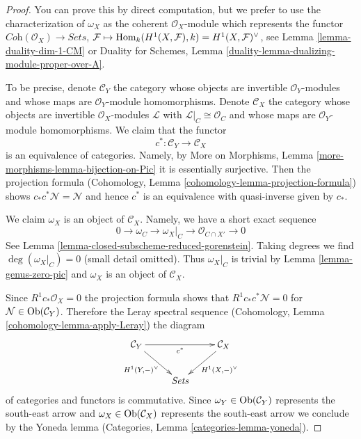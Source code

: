 \begin{proof}
You can prove this by direct computation, but we prefer to use the
characterization of $\omega_X$ as the coherent $\mathcal{O}_X$-module
which represents the functor
$\textit{Coh}(\mathcal{O}_X) \to \textit{Sets}$,
$\mathcal{F} \mapsto \mathop{\mathrm{Hom}}\nolimits_k(H^1(X, \mathcal{F}), k) =
H^1(X, \mathcal{F})^\vee$, see
Lemma \ref{lemma-duality-dim-1-CM} or
Duality for Schemes, Lemma
\ref{duality-lemma-dualizing-module-proper-over-A}.

\medskip\noindent
To be precise, denote $\mathcal{C}_Y$ the category whose objects are
invertible $\mathcal{O}_Y$-modules and whose maps are
$\mathcal{O}_Y$-module homomorphisms. Denote $\mathcal{C}_X$ the category
whose objects are invertible $\mathcal{O}_X$-modules $\mathcal{L}$ with
$\mathcal{L}|_C \cong \mathcal{O}_C$ and whose maps are
$\mathcal{O}_Y$-module homomorphisms. We claim that the functor
$$
c^* : \mathcal{C}_Y \to \mathcal{C}_X
$$
is an equivalence of categories. Namely, by
More on Morphisms, Lemma \ref{more-morphisms-lemma-bijection-on-Pic}
it is essentially surjective. Then the projection formula
(Cohomology, Lemma \ref{cohomology-lemma-projection-formula})
shows $c_*c^*\mathcal{N} = \mathcal{N}$ and hence $c^*$
is an equivalence with quasi-inverse given by $c_*$.

\medskip\noindent
We claim $\omega_X$ is an object of $\mathcal{C}_X$. Namely, we have a
short exact sequence
$$
0 \to \omega_C \to \omega_X|_C \to \mathcal{O}_{C \cap X'} \to 0
$$
See Lemma \ref{lemma-closed-subscheme-reduced-gorenstein}.
Taking degrees we find $\deg(\omega_X|_C) = 0$ (small detail omitted).
Thus $\omega_X|_C$ is trivial by Lemma \ref{lemma-genus-zero-pic}
and $\omega_X$ is an object of $\mathcal{C}_X$.

\medskip\noindent
Since $R^1c_*\mathcal{O}_X = 0$ the projection formula shows that
$R^1c_*c^*\mathcal{N} = 0$ for $\mathcal{N} \in \mathop{\mathrm{Ob}}\nolimits(\mathcal{C}_Y)$.
Therefore the Leray spectral sequence
(Cohomology, Lemma \ref{cohomology-lemma-apply-Leray})
the diagram
$$
\xymatrix{
\mathcal{C}_Y \ar[rr]_{c^*} \ar[dr]_{H^1(Y, -)^\vee} & &
\mathcal{C}_X \ar[ld]^{H^1(X, -)^\vee} \\
& \textit{Sets}
}
$$
of categories and functors is commutative. Since
$\omega_Y \in \mathop{\mathrm{Ob}}\nolimits(\mathcal{C}_Y)$ represents the south-east arrow and
$\omega_X \in \mathop{\mathrm{Ob}}\nolimits(\mathcal{C}_X)$ represents the south-east arrow
we conclude by the Yoneda lemma
(Categories, Lemma \ref{categories-lemma-yoneda}).
\end{proof}

